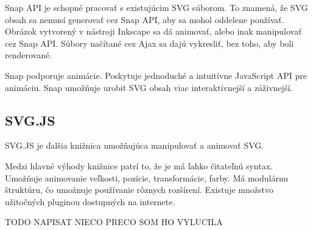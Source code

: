 Snap API je schopné pracovať s existujúcim SVG súborom. To znamená, že SVG obsah sa nemusí  generovať cez Snap API, aby sa mohol oddelene používať. Obrázok vytvorený v nástroji  Inkscape sa dá animovať, alebo inak manipulovať cez Snap API.
Súbory načítané cez Ajax sa dajú vykresliť, bez toho, aby boli renderované. 


Snap podporuje animácie. Poskytuje jednoduché a intuitívne JavaScript API pre animáciu. Snap umožňuje urobiť SVG obsah viac interaktívnejší a záživnejší. \cite{snapsvg}





\subsection{SVG.JS}

SVG.JS je ďalšia knižnica umožňujúca manipulovať a animovať SVG.

Medzi hlavné výhody knižnice patrí to, že je má ľahko čitateľnú syntax. Umožňuje animovanie veľkosti, pozície, transformácie, farby. Má modulárnu štruktúru, čo umožnuje používanie rôznych rozšírení. Existuje množstvo užitočných pluginou dostupných na internete. \cite{svgjs}

TODO NAPISAT NIECO PRECO SOM HO VYLUCILA

